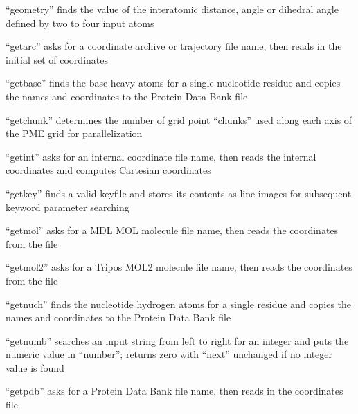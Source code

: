 \documentclass[letterpaper,11pt,english]{sphinxmanual}
\begin{document}

“geometry” finds the value of the interatomic distance, angle
or dihedral angle defined by two to four input atoms


“getarc” asks for a coordinate archive or trajectory file name,
then reads in the initial set of coordinates


“getbase” finds the base heavy atoms for a single nucleotide
residue and copies the names and coordinates to the Protein
Data Bank file


“getchunk” determines the number of grid point “chunks” used
along each axis of the PME grid for parallelization


“getint” asks for an internal coordinate file name, then reads
the internal coordinates and computes Cartesian coordinates


“getkey” finds a valid keyfile and stores its contents as
line images for subsequent keyword parameter searching


“getmol” asks for a MDL MOL molecule file name,
then reads the coordinates from the file


“getmol2” asks for a Tripos MOL2 molecule file name,
then reads the coordinates from the file



“getnuch” finds the nucleotide hydrogen atoms for a single
residue and copies the names and coordinates to the Protein
Data Bank file


“getnumb” searches an input string from left to right for an
integer and puts the numeric value in “number”; returns zero
with “next” unchanged if no integer value is found


“getpdb” asks for a Protein Data Bank file name,
then reads in the coordinates file
\end{document}
